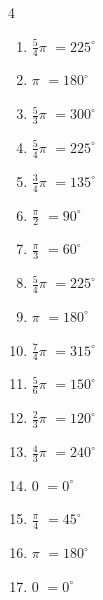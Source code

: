 \begin{multicols}{4}
\begin{enumerate}
  \item $\displaystyle \frac{5}{4}\pi$
        $\displaystyle =225^{\circ}$

  \item $\displaystyle \pi$
        $\displaystyle =180^{\circ}$

  \item $\displaystyle \frac{5}{3}\pi$
        $\displaystyle =300^{\circ}$

  \item $\displaystyle \frac{5}{4}\pi$
        $\displaystyle =225^{\circ}$

  \item $\displaystyle \frac{3}{4}\pi$
        $\displaystyle =135^{\circ}$

  \item $\displaystyle \frac{\pi}{2}$
        $\displaystyle =90^{\circ}$

  \item $\displaystyle \frac{\pi}{3}$
        $\displaystyle =60^{\circ}$

  \item $\displaystyle \frac{5}{4}\pi$
        $\displaystyle =225^{\circ}$

  \item $\displaystyle \pi$
        $\displaystyle =180^{\circ}$

  \item $\displaystyle \frac{7}{4}\pi$
        $\displaystyle =315^{\circ}$

  \item $\displaystyle \frac{5}{6}\pi$
        $\displaystyle =150^{\circ}$

  \item $\displaystyle \frac{2}{3}\pi$
        $\displaystyle =120^{\circ}$

  \item $\displaystyle \frac{4}{3}\pi$
        $\displaystyle =240^{\circ}$

  \item $\displaystyle 0$
        $\displaystyle =0^{\circ}$

  \item $\displaystyle \frac{\pi}{4}$
        $\displaystyle =45^{\circ}$

  \item $\displaystyle \pi$
        $\displaystyle =180^{\circ}$

  \item $\displaystyle 0$
        $\displaystyle =0^{\circ}$


\end{enumerate}
\end{multicols}
